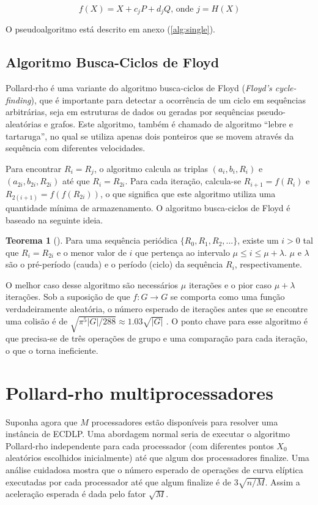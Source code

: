 \begin{equation*}
f(X) = X + c_jP + d_jQ \textrm{, onde } j = H(X)
\end{equation*}

O pseudoalgoritmo está descrito em anexo (\ref{alg:single}).

%
%
\subsection{Algoritmo Busca-Ciclos de Floyd} \label{floyd}
Pollard-rho é uma variante do algoritmo busca-ciclos de Floyd (\textit{Floyd's cycle-finding}), que é importante para detectar a ocorrência de um ciclo em sequências arbitrárias, seja em estruturas de dados ou geradas por sequências pseudo-aleatórias e grafos. Este algoritmo, também é chamado de algoritmo ``lebre e tartaruga'', no qual se utiliza apenas dois ponteiros que se movem através da sequência com diferentes velocidades.

Para encontrar \(R_i = R_j\), o algoritmo calcula as triplas $(a_i, b_i, R_i)$ e $(a_{2i}, b_{2i}, R_{2i})$ até que \(R_i = R_{2i}\). Para cada iteração, calcula-se \(R_{i+1} = f(R_i)\) e \(R_{2(i+1)} = f(f(R_{2i}))\), o que significa que este algoritmo utiliza uma quantidade mínima de armazenamento. O algoritmo busca-ciclos de Floyd é baseado na seguinte ideia. \cite{Ping:2011} \cite{Brent:2008}

\textbf{Teorema 1} (\cite{Knuth:1997}). Para uma sequência periódica \(\{R_0, R_1, R_2, ...\}\), existe um \(i > 0\) tal que \(R_i = R_{2i}\) e o menor valor de \(i\) que pertença ao intervalo \(\mu \leq i \leq \mu + \lambda\). \(\mu\) e \(\lambda\) são o pré-período (cauda) e o período (ciclo) da sequência \(R_i\), respectivamente.

O melhor caso desse algoritmo são necessários \(\mu\) iterações e o pior caso \(\mu + \lambda\) iterações. Sob a suposição de que \(f : G \to G\) se comporta como uma função verdadeiramente aleatória, o número esperado de iterações antes que se encontre uma colisão é de $\sqrt{\pi^5 |G|/288} \approx 1.03 \sqrt{|G|}$ \cite{Brent:2008}. O ponto chave para esse algoritmo é que precisa-se de três operações de grupo e uma comparação para cada iteração, o que o torna ineficiente.

%
%
\section{Pollard-rho multiprocessadores} \label{sec:parallelized}
Suponha agora que \(M\) processadores estão disponíveis para resolver uma instância de ECDLP. Uma abordagem normal seria de executar o algoritmo Pollard-rho independente para cada processador (com diferentes pontos \(X_0\) aleatórios escolhidos inicialmente) até que algum dos processadores finalize. Uma análise cuidadosa mostra que o número esperado de operações de curva elíptica executadas por cada processador até que algum finalize é de $3\sqrt{n/M}$. Assim a aceleração esperada é dada pelo fator $\sqrt{M}$. \cite{Guide}

